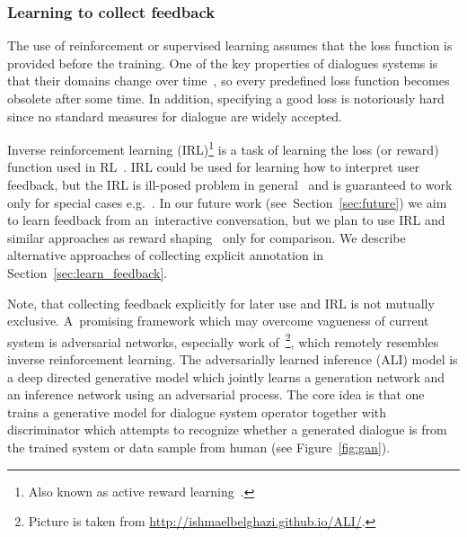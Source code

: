 \documentclass[11pt]{article}
\begin{document}
\subsubsection*{Learning to collect feedback}\label{sub:irl}
The use of reinforcement or supervised learning assumes that the loss function is provided before the training.
One of the key properties of dialogues systems is that their domains change over time~\cite{yu_evolvable_2016}, so every predefined loss function becomes obsolete after some time.
In addition, specifying a good loss is notoriously hard since no standard measures for dialogue are widely accepted.

Inverse reinforcement learning (IRL)\footnote{Also known as active reward learning~\cite{su2016active}.} is a task of learning the loss (or reward) function used in RL~\cite{abbeel_apprenticeship_2004}.
IRL could be used for learning how to interpret user feedback, but the IRL is ill-posed problem in general~\cite{choi_inverse_2011} and is guaranteed to work only for special cases e.g.~\cite{abbeel_apprenticeship_2004,choi_inverse_2011}.
In our future work (see~Section~\ref{sec:future}) we aim to learn feedback from an~interactive conversation, but we plan to use IRL and similar approaches as reward shaping~\cite{su2016active} only for comparison.
We describe alternative approaches of collecting explicit annotation in Section~\ref{sec:learn_feedback}.

Note, that collecting feedback explicitly for later use and IRL is not mutually exclusive.
A~promising framework which may overcome vagueness of current system is adversarial networks, especially work of~\cite{dumoulin_adversarially_2016}\footnote{Picture is taken from \url{http://ishmaelbelghazi.github.io/ALI/}.}, which remotely resembles inverse reinforcement learning.
The adversarially learned inference (ALI) model is a deep directed generative model which jointly learns a generation network and an inference network using an adversarial process. 
The core idea is that one trains a generative model for dialogue system operator together with discriminator which attempts to recognize whether a generated dialogue is from the trained system or data sample from human (see Figure~\ref{fig:gan}).
\end{document}
